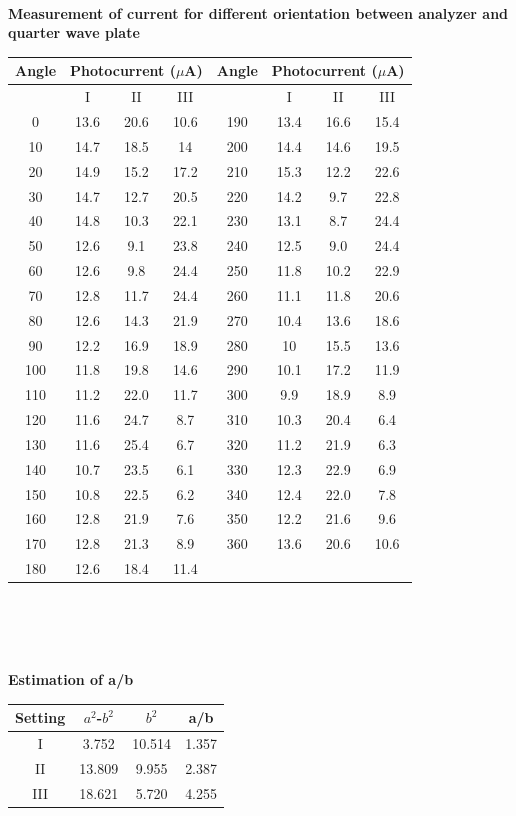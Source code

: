 \documentclass[12pt]{report}
\begin{document}
\newpage
\textbf{ \\Measurement of current for different orientation between analyzer and quarter wave plate}
\begin{center}
	\begin{tabular}{ |c|c|c|c|c|c|c|c| } 
		\hline
		Angle & \multicolumn{3}{c}{Photocurrent ($\mu$A)} & Angle & \multicolumn{3}{|c|}{Photocurrent ($\mu$A)}\\ 
		\hline
		& I & II & III &  & I & II & III \\
		\hline
0   & 13.6 & 20.6 & 10.6 & 190 & 13.4 & 16.6 & 15.4 \\
10  & 14.7 & 18.5 & 14   & 200 & 14.4 & 14.6 & 19.5 \\
20  & 14.9 & 15.2 & 17.2 & 210 & 15.3 & 12.2 & 22.6 \\
30  & 14.7 & 12.7 & 20.5 & 220 & 14.2 & 9.7  & 22.8 \\
40  & 14.8 & 10.3 & 22.1 & 230 & 13.1 & 8.7  & 24.4 \\
50  & 12.6 & 9.1  & 23.8 & 240 & 12.5 & 9.0  & 24.4 \\
60  & 12.6 & 9.8  & 24.4 & 250 & 11.8 & 10.2 & 22.9 \\
70  & 12.8 & 11.7 & 24.4 & 260 & 11.1 & 11.8 & 20.6 \\
80  & 12.6 & 14.3 & 21.9 & 270 & 10.4 & 13.6 & 18.6 \\
90  & 12.2 & 16.9 & 18.9 & 280 & 10   & 15.5 & 13.6 \\
100 & 11.8 & 19.8 & 14.6 & 290 & 10.1 & 17.2 & 11.9 \\
110 & 11.2 & 22.0 & 11.7 & 300 & 9.9  & 18.9 & 8.9  \\
120 & 11.6 & 24.7 & 8.7  & 310 & 10.3 & 20.4 & 6.4  \\
130 & 11.6 & 25.4 & 6.7  & 320 & 11.2 & 21.9 & 6.3  \\
140 & 10.7 & 23.5 & 6.1  & 330 & 12.3 & 22.9 & 6.9  \\
150 & 10.8 & 22.5 & 6.2  & 340 & 12.4 & 22.0 & 7.8  \\
160 & 12.8 & 21.9 & 7.6  & 350 & 12.2 & 21.6 & 9.6  \\
170 & 12.8 & 21.3 & 8.9  & 360 & 13.6 & 20.6 & 10.6 \\
180 & 12.6 & 18.4 & 11.4 &     &      &      &    \\ 
		\hline
	\end{tabular}
	\\
\end{center}

\text{ }\\ \\
\textbf{Estimation of a/b}
\begin{center}
	\begin{tabular}{ |c|c|c|c| } 
		\hline
		Setting& $a^2$-$b^2$ & $b^2$ & a/b\\
		\hline
		I&3.752  & 10.514 & 1.357\\
		II&13.809 & 9.955  & 2.387\\
		III&18.621 & 5.720  & 4.255\\
		\hline
\end{tabular}
\\
\end{center}
\end{document}
